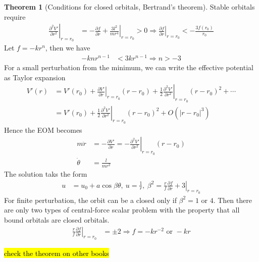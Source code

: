 \documentclass[twoside,9pt]{article}
\numberwithin{equation}{section} %
\newcommand{\lms}{\fontfamily{lmss}\selectfont} %
\theoremstyle{definition}
\newtheorem{theorem}{\lms Theorem}[section]
\theoremstyle{remark}
\begin{document}
\begin{theorem}[Conditions for closed orbitals, Bertrand's theorem]
Stable orbitals require
\begin{align}
    \left.\frac{\partial^2 V'}{\partial r^2}\right|_{r=r_0}
    &= \left.-\frac{\partial f}{\partial r} + \frac{3l^2}{mr^4} \right|_{r=r_0}>0
    \Rightarrow
    \left.\frac{\partial f}{\partial r}\right|_{r=r_0} < -\frac{3f(r_0)}{r_0}
\end{align}
Let $f=-kr^n$, then we have
\begin{align}
    -knr^{n-1} &< 3kr^{n-1}
    \Rightarrow
    n > -3
\end{align}
For a small perturbation from the minimum, we can write the effective potential
as Taylor expansion
\begin{align}
    V'(r) &= 
    V'(r_0) + \left.\frac{\partial V'}{\partial r}\right|_{r=r_0}(r-r_0)
    + \frac{1}{2}\left.\frac{\partial^2 V'}{\partial r^2}\right|_{r=r_0}
    (r-r_0)^2 + \cdots \\
    & = V'(r_0) + \frac{1}{2}\left.\frac{\partial^2 V'}{\partial r^2}\right|_{r=r_0}
    (r-r_0)^2 + O(|r-r_0|^3)
\end{align}
Hence the EOM becomes 
\begin{align}
    m\ddot{r} &= -\frac{\partial V'}{\partial r}
    = \left.-\frac{\partial^2 V'}{\partial r^2}\right|_{r=r_0}(r-r_0)\\
    \dot\theta &= \frac{l}{mr^2}
\end{align}
The solution taks the form
\begin{align}
    u &= u_0 + a\cos \beta\theta, ~u=\frac{1}{r},~
    \beta^2 = \left.\frac{r}{f}\frac{\partial f}{\partial r} + 3\right|_{r=r_0}
\end{align}
For finite perturbation, the orbit can be a closed only if $\beta^2=1$ or $4$.
Then there are only two types of central-force scalar problem with the property
that all bound orbitals are closed orbitals.
\begin{align}
    \left.\frac{r}{f}\frac{\partial f}{\partial r}\right|_{r=r_0} 
    &= \pm 2\Rightarrow
    f = -kr^{-2}\text{ or } -kr
\end{align}

\hl{check the theorem on other books}
\end{theorem}
\end{document}
